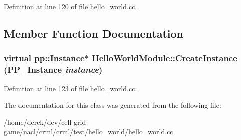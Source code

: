 Definition at line 120 of file hello\_\-world.cc.



\subsection{Member Function Documentation}
\hypertarget{class_hello_world_module_a6ee0eeeb3ed2f95b819adfd4df33c47f}{
\subsubsection[{CreateInstance}]{\setlength{\rightskip}{0pt plus 5cm}virtual pp::Instance$\ast$ HelloWorldModule::CreateInstance (PP\_\-Instance {\em instance})}}
\label{class_hello_world_module_a6ee0eeeb3ed2f95b819adfd4df33c47f}


Definition at line 123 of file hello\_\-world.cc.



The documentation for this class was generated from the following file:\begin{DoxyCompactItemize}
\item 
/home/derek/dev/cell-\/grid-\/game/nacl/crml/crml/test/hello\_\-world/\hyperlink{hello__world_8cc}{hello\_\-world.cc}\end{DoxyCompactItemize}
